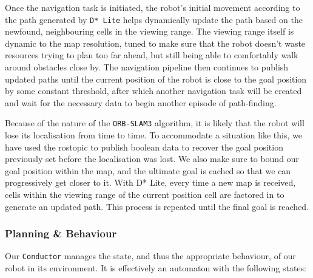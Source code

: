 \documentclass[10pt,english]{article}
\begin{document}
Once the navigation task is initiated, the robot's initial movement according to the path generated by \texttt{D* Lite} helps dynamically update the path based on the newfound, neighbouring cells in the viewing range. The viewing range itself is dynamic to the map resolution, tuned to make sure that the robot doesn't waste resources trying to plan too far ahead, but still being able to comfortably walk around obstacles close by. The navigation pipeline then continues to publish updated paths until the current position of the robot is close to the goal position by some constant threshold, after which another navigation task will be created and wait for the necessary data to begin another episode of path-finding.

Because of the nature of the \texttt{ORB-SLAM3} algorithm, it is likely that the robot will lose its localisation from time to time. To accommodate a situation like this, we have used the rostopic to publish boolean data to recover the goal position previously set before the localisation was lost. We also make sure to bound our goal position within the map, and the ultimate goal is cached so that we can progressively get closer to it. With D* Lite, every time a new map is received, cells within the viewing range of the current position cell are factored in to generate an updated path. This process is repeated until the final goal is reached.


\subsubsection*{Planning \& Behaviour}

Our \texttt{Conductor} manages the state, and thus the appropriate behaviour, of our robot in its environment. It is effectively an automaton with the following states:
\end{document}
